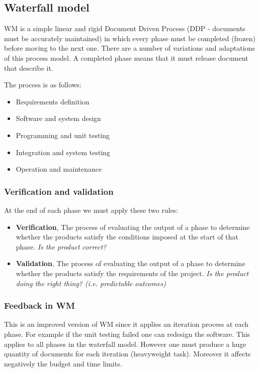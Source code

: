 \documentclass{article}
\begin{document}
	\subsection*{Waterfall model}
	WM is a simple linear and rigid Document Driven Process (DDP - documents must be accurately maintained)
	in which every phase must be completed
	(frozen) before moving to the next one. There are a number of variations and adaptations of this process model.
	A completed phase means that it must release document that describe it.
	
	The process is as follows:
	\begin{itemize}
		\item Requirements definition
		\item Software and system design
		\item Programming and unit testing
		\item Integration and system testing
		\item Operation and maintenance
	\end{itemize}
	
	
	\subsubsection*{Verification and validation}	
	At the end of each phase we must apply these two rules:
	\begin{itemize}
		\item \textbf{Verification}, The process of evaluating the output of a phase to
		determine whether the products satisfy the conditions
		imposed at the start of that phase. \textit{Is the product correct?}
		\item \textbf{Validation}, The process of evaluating the output of a phase to
		determine whether the products satisfy the
		requirements of the project. \textit{Is the product doing the right thing? (i.e. predictable outcomes)}
	\end{itemize}
	
	\subsubsection*{Feedback in WM}	
	This is an improved version of WM since it applies an iteration process at each phase. For example if
	the unit testing failed one can redesign the software. This applies to all phases in the waterfall
	model. However one must produce a huge quantity of documents for each iteration (heavyweight task). Moreover
	it affects negatively the budget and time limits.
	
\end{document}
